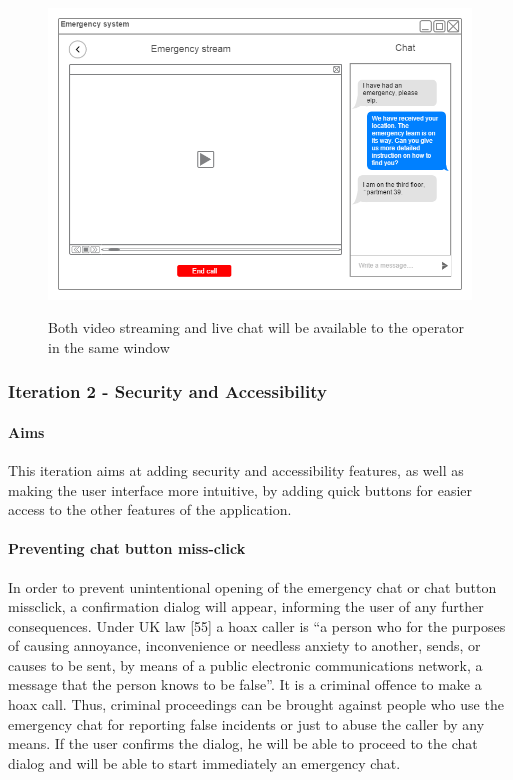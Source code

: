\documentclass{article}
\begin{document}
	\begin{figure}[H]
		\centering
		\includegraphics[width=1\textwidth]{"ChatIteration1/backend_video_call (1)"}
		
		Both video streaming and live chat will be available to the operator in the same window
	\end{figure}

		\subsubsection{Iteration 2 - Security and Accessibility}
			\paragraph{Aims}
			This iteration aims at adding security and accessibility features, as well as making the user interface more intuitive, by adding quick buttons for easier access to the other features of the application.

	\paragraph{Preventing chat button miss-click}
	In order to prevent unintentional opening of the emergency chat or chat button missclick, a confirmation dialog will appear, informing the user of any further consequences. Under UK law [55] a hoax caller is “a person who for the purposes of causing annoyance, inconvenience or needless anxiety to another, sends, or causes to be sent, by means of a public electronic communications network, a message that the person knows to be false”. It is a criminal offence to make a hoax call. Thus, criminal proceedings can be brought against people who use the emergency chat for reporting false incidents or just to abuse the caller by any means. If the user confirms the dialog, he will be able to proceed to the chat dialog and will be able to start immediately an emergency chat.
\end{document}
